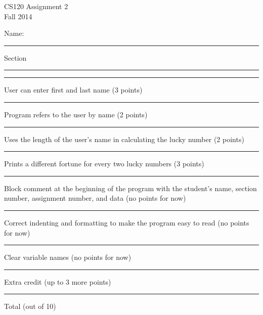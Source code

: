 \documentclass[12pt,openbib]{article}
\begin{document}
\thispagestyle{empty}
\vspace{-1.0in}
\large
\begin{center}
\textsf{CS120  Assignment 2}\\
\textsf{Fall 2014}
\end{center}
\vspace{-0.2in}
\large\textsf{Name: }\rule[-0.01in]{2.5in}{0.015in}
\hspace{0.5in} Section \rule[-0.01in]{1.0in}{0.015in}

\normalsize
\rm
\vspace{0.5in}
\rule[-0.01in]{0.5in}{0.015in} User can enter first and last name (3 points)
 
\rule[-0.01in]{0.5in}{0.015in} Program refers to the user by name (2 points)

\rule[-0.01in]{0.5in}{0.015in} Uses the length of the user's name in calculating the lucky number (2 points)

\rule[-0.01in]{0.5in}{0.015in} Prints a different fortune for every two lucky numbers (3 points)

\rule[-0.01in]{0.5in}{0.015in} Block comment at the beginning of the program with the student's name, section number, assignment number, and data (no points for now)

\rule[-0.01in]{0.5in}{0.015in} Correct indenting and formatting to make the program easy to read (no points for now)

\rule[-0.01in]{0.5in}{0.015in} Clear variable names (no points for now)

\rule[-0.01in]{0.5in}{0.015in} Extra credit (up to 3 more points)

\rule[-0.01in]{0.5in}{0.015in} Total (out of 10)
\end{document}
